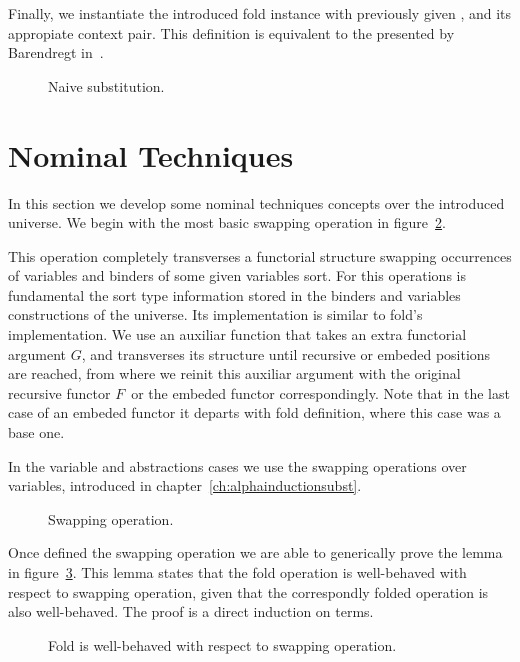 \documentclass{book}
\begin{document}
Finally, we instantiate the introduced fold instance with previously given , and its appropiate context pair. This definition is equivalent to the presented by Barendregt in~\cite{bar:84}.

\begin{figure}[h!]
   \caption{Naive substitution.}
 \label{fig:naivesubst}
 \end{figure}


\section{Nominal Techniques}

In this section we develop some nominal techniques concepts over the introduced universe. We begin with the most basic swapping operation in figure~\ref{fig:swap}. 

This operation completely transverses a functorial structure swapping occurrences of variables and binders of some given variables sort. For this operations is fundamental the sort type information stored in the binders and variables constructions of the universe. Its implementation is similar to fold's implementation. We use an auxiliar  function that takes an extra functorial argument $G$, and transverses its structure until recursive or embeded positions are reached, from where we reinit this auxiliar argument with the original recursive functor $F$\ or the embeded functor correspondingly. Note that in the last case of an embeded functor it departs with fold definition, where this case was a base one. 

In the variable and abstractions cases we use the swapping operations over variables, introduced in chapter~\ref{ch:alphainductionsubst}.

\begin{figure}[h]
  \caption{Swapping operation.}
\label{fig:swap}
\end{figure}

Once defined the swapping operation we are able to generically prove the lemma in figure~\ref{fig:swapfold}. This lemma states that the fold operation is well-behaved with respect to swapping operation, given that the correspondly folded operation is also well-behaved. The proof is a direct induction on terms.

\begin{figure}[h]
  \caption{Fold is well-behaved with respect to swapping operation.}
\label{fig:swapfold}
\end{figure}
\end{document}
